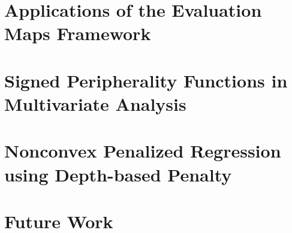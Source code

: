 \documentclass{umnStatThesis}
\begin{document}
\chapter{Applications of the Evaluation Maps Framework}
\label{chapter:appli-chapter}
%




\chapter{Signed Peripherality Functions in Multivariate Analysis}
\label{chapter:scatter-chapter}
%







\chapter{Nonconvex Penalized Regression using Depth-based Penalty}
\label{chapter:regression-chapter}
%








\chapter{Future Work}



\end{document}
